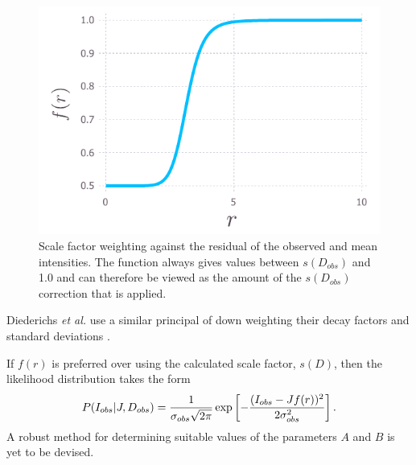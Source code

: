 \begin{figure}
  \centering
  \includegraphics[width=1\textwidth]{figures/zde/scale_factor_function.pdf}
    \caption[Scale factor weighting against the residual of the observed and mean intensities.]{Scale factor weighting against the residual of the observed and mean intensities.
    The function always gives values between $s(D_{obs})$ and 1.0 and can therefore be viewed as the amount of the $s(D_{obs})$ correction that is applied.}
    \label{fig:Scale factor weighting - Extrapolation method}
\end{figure}
Diederichs \textit{et al.} \cite{diederichs2003} use a similar principal of down weighting their decay factors and standard deviations \cite{diederichs2003}.

If $f(r)$ is preferred over using the calculated scale factor, $s(D)$, then the likelihood distribution takes the form
\begin{equation}
    P(I_{obs} | J, D_{obs}) = \frac{1}{\sigma_{obs} \sqrt{2\pi}} \exp \left[-\frac{(I_{obs} - J f(r))^2}{2 \sigma^2_{obs}} \right].
    \label{eq:Normally distributed intensity with weighted scale factor - Extrapolation method}
\end{equation}
A robust method for determining suitable values of the parameters $A$ and $B$ is yet to be devised.


